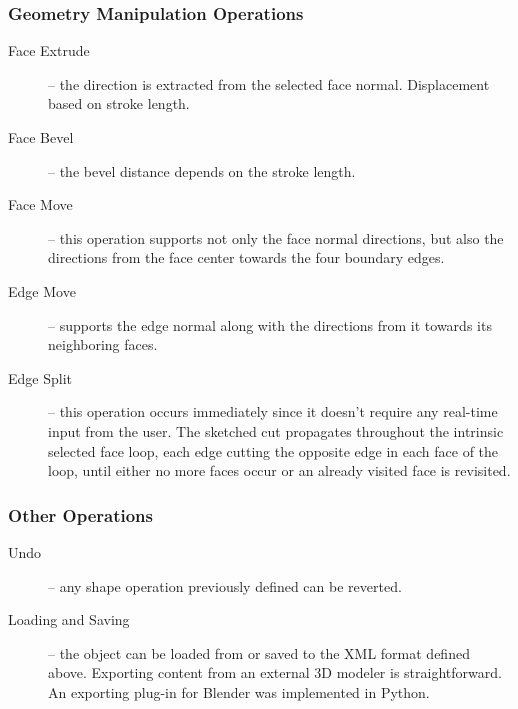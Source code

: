 
\subsubsection{Geometry Manipulation Operations}

\begin{description}
	\item[Face Extrude] --
		the direction is extracted from the selected face normal. Displacement based on stroke length.
		
	\item[Face Bevel] --
		the bevel distance depends on the stroke length.
		
	\item[Face Move] --
		this operation supports not only the face normal directions,
		but also the directions from the face center towards the four boundary edges.
		
	\item[Edge Move] --
		supports the edge normal along with the directions from it towards its neighboring faces.
		
	\item[Edge Split] --
		this operation occurs immediately since it doesn't require any real-time input from the user.
		The sketched cut propagates throughout the intrinsic selected face loop, each edge cutting
		the opposite edge in each face of the loop, until either no more faces occur or an already
		visited face is revisited. 
\end{description}

\subsubsection{Other Operations}

\begin{description}
	\item[Undo] --
		any shape operation previously defined can be reverted.
		
	\item[Loading and Saving] --
		the object can be loaded from or saved to the XML format defined above.
		Exporting content from an external 3D modeler is straightforward.
		An exporting plug-in for Blender was implemented in Python.
\end{description}

